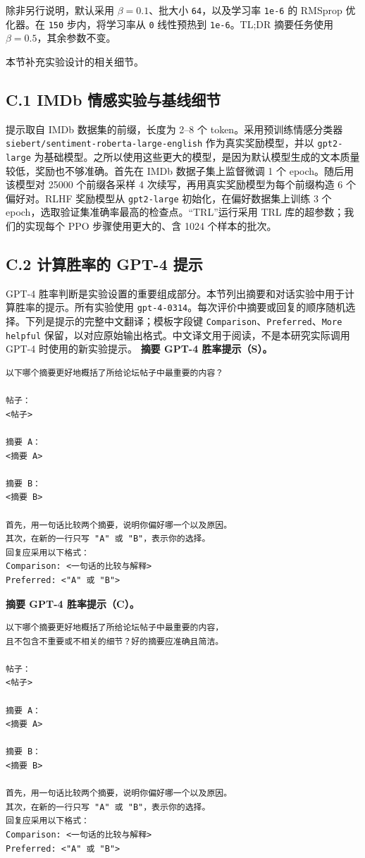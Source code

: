 除非另行说明，默认采用 $\beta=0.1$、批大小 \texttt{64}，以及学习率 \texttt{1e-6} 的 RMSprop 优化器。在 \texttt{150} 步内，将学习率从 \texttt{0} 线性预热到 \texttt{1e-6}。TL;DR 摘要任务使用 $\beta=0.5$，其余参数不变。


本节补充实验设计的相关细节。
\subsection*{C.1 IMDb 情感实验与基线细节}
提示取自 IMDb 数据集的前缀，长度为 2--8 个 token。采用预训练情感分类器 \nolinkurl{siebert/sentiment-roberta-large-english} 作为真实奖励模型，并以 \texttt{gpt2-large} 为基础模型。之所以使用这些更大的模型，是因为默认模型生成的文本质量较低，奖励也不够准确。首先在 IMDb 数据子集上监督微调 1 个 epoch。随后用该模型对 25000 个前缀各采样 4 次续写，再用真实奖励模型为每个前缀构造 6 个偏好对。RLHF 奖励模型从 \texttt{gpt2-large} 初始化，在偏好数据集上训练 3 个 epoch，选取验证集准确率最高的检查点。“TRL”运行采用 TRL 库的超参数；我们的实现每个 PPO 步骤使用更大的、含 1024 个样本的批次。

\subsection*{C.2 计算胜率的 GPT-4 提示}
GPT-4 胜率判断是实验设置的重要组成部分。本节列出摘要和对话实验中用于计算胜率的提示。所有实验使用 \texttt{gpt-4-0314}。每次评价中摘要或回复的顺序随机选择。下列是提示的完整中文翻译；模板字段键 \texttt{Comparison}、\texttt{Preferred}、\texttt{More helpful} 保留，以对应原始输出格式。中文译文用于阅读，不是本研究实际调用 GPT-4 时使用的新实验提示。
\textbf{摘要 GPT-4 胜率提示（S）。}
\begin{verbatim}
以下哪个摘要更好地概括了所给论坛帖子中最重要的内容？

帖子：
<帖子>

摘要 A：
<摘要 A>

摘要 B：
<摘要 B>

首先，用一句话比较两个摘要，说明你偏好哪一个以及原因。
其次，在新的一行只写 "A" 或 "B"，表示你的选择。
回复应采用以下格式：
Comparison: <一句话的比较与解释>
Preferred: <"A" 或 "B">
\end{verbatim}

\textbf{摘要 GPT-4 胜率提示（C）。}
\begin{verbatim}
以下哪个摘要更好地概括了所给论坛帖子中最重要的内容，
且不包含不重要或不相关的细节？好的摘要应准确且简洁。

帖子：
<帖子>

摘要 A：
<摘要 A>

摘要 B：
<摘要 B>

首先，用一句话比较两个摘要，说明你偏好哪一个以及原因。
其次，在新的一行只写 "A" 或 "B"，表示你的选择。
回复应采用以下格式：
Comparison: <一句话的比较与解释>
Preferred: <"A" 或 "B">
\end{verbatim}

